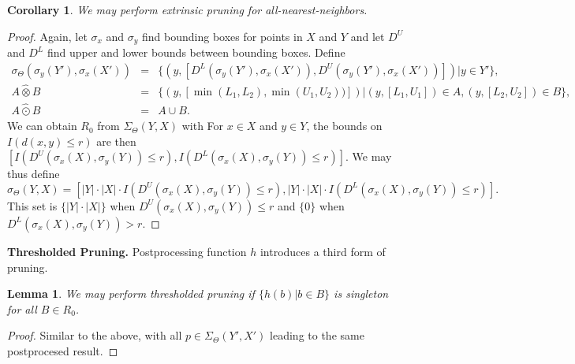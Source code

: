 \documentclass{article}
\newtheorem{lemma}{Lemma}
\newtheorem{corollary} {Corollary}
\newcommand{\GNP}[1][\psi]{{#1}_{\Theta}}
\newcommand{\otimeshat}{\mathbin{\widehat{\otimes}}}
\newcommand{\odothat}{\mathbin{\widehat{\odot}}}
\begin{document}
\begin{corollary}
  We may perform extrinsic pruning for all-nearest-neighbors.
\end{corollary}
\begin{proof}
  Again, let $\sigma_x$ and $\sigma_y$ find bounding boxes for points in $X$
  and $Y$ and let $D^{\!U}$ and $D^{\!L}$ find upper and lower bounds
  between bounding boxes.  Define
  \begin{eqnarray*}
    \GNP[\sigma](\sigma_y(Y'),\sigma_x(X')) & = & \{(y,[D^{\!L}(\sigma_y(Y'),\sigma_x(X')), D^{\!U}(\sigma_y(Y'),\sigma_x(X'))]) | y \in Y'\}, \\
    A \otimeshat B & = & \{(y,[\min(L_1,L_2),\min(U_1,U_2))]) | (y,[L_1,U_1]) \in A, (y,[L_2,U_2]) \in B\}, \\
    A \odothat B & = & A \cup B.
  \end{eqnarray*}
  We can obtain $R_0$ from $\GNP[\Sigma](Y,X)$ with
For $x \in X$ and $y \in Y$, the bounds on
  $I(d(x,y) \leq r)$ are then $\left[
  I(D^{\!U}(\sigma_x(X),\sigma_y(Y)) \leq r),
  I(D^{\!L}(\sigma_x(X),\sigma_y(Y)) \leq r) \right]$.  We may thus
  define
  \[
  \GNP[\sigma](Y,X) = \left[ |Y| \cdot |X| \cdot I(D^{\!U}(\sigma_x(X),\sigma_y(Y)) \leq r), |Y| \cdot |X| \cdot I(D^{\!L}(\sigma_x(X),\sigma_y(Y)) \leq r) \right].
  \]
  This set is $\{|Y| \cdot |X|\}$ when
  $D^{\!U}(\sigma_x(X),\sigma_y(Y)) \leq r$ and $\{0\}$ when
  $D^{\!L}(\sigma_x(X),\sigma_y(Y)) > r$.
\end{proof}


{\bf Thresholded Pruning.}  Postprocessing function $h$ introduces a
third form of pruning.
\begin{lemma}
  We may perform {\em thresholded pruning} if $\{h(b) | b \in B\}$ is
  singleton for all $B \in R_0$.
\end{lemma}
\begin{proof}
  Similar to the above, with all $p \in \GNP[\Sigma](Y',X')$ leading
  to the same postprocesed result.
\end{proof}

\end{document}
